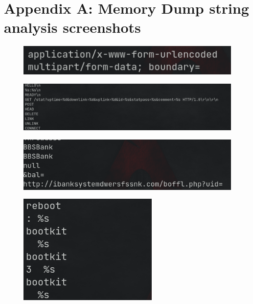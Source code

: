\documentclass[10pt,a4paper]{article}
\begin{document}
\section{Appendix A: Memory Dump string analysis screenshots}
	\begin{figure}[!htbp]%
		\centering
		\includegraphics[width=\columnwidth]{pics/sus1.png}
	\end{figure}
	\begin{figure}[!htbp]%
		\centering
		\includegraphics[width=\columnwidth]{pics/sus2.png}
	\end{figure}
	\begin{figure}[!htbp]%
		\centering
		\includegraphics[width=\columnwidth]{pics/sus3.png}
	\end{figure}
	\begin{figure}[!htbp]%
		\centering
		\includegraphics[width=\columnwidth]{pics/sus4.png}
	\end{figure}
\end{document}
